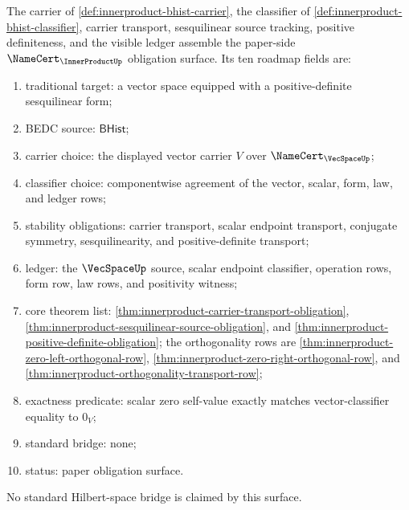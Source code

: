 \begin{theorem}
\label{thm:innerproduct-namecert-obligation-surface}
The carrier of \autoref{def:innerproduct-bhist-carrier}, the classifier of
\autoref{def:innerproduct-bhist-classifier}, carrier transport, sesquilinear
source tracking, positive definiteness, and the visible ledger assemble the
paper-side $\NameCert_{\InnerProductUp}$ obligation surface. Its ten roadmap
fields are:
\begin{enumerate}
  \item traditional target: a vector space equipped with a positive-definite
  sesquilinear form;
  \item BEDC source: $\mathsf{BHist}$;
  \item carrier choice: the displayed vector carrier $V$ over
  $\NameCert_{\VecSpaceUp}$;
  \item classifier choice: componentwise agreement of the vector, scalar,
  form, law, and ledger rows;
  \item stability obligations: carrier transport, scalar endpoint transport,
  conjugate symmetry, sesquilinearity, and positive-definite transport;
  \item ledger: the $\VecSpaceUp$ source, scalar endpoint classifier,
  operation rows, form row, law rows, and positivity witness;
  \item core theorem list:
  \autoref{thm:innerproduct-carrier-transport-obligation},
  \autoref{thm:innerproduct-sesquilinear-source-obligation}, and
  \autoref{thm:innerproduct-positive-definite-obligation};
  the orthogonality rows are
  \autoref{thm:innerproduct-zero-left-orthogonal-row},
  \autoref{thm:innerproduct-zero-right-orthogonal-row}, and
  \autoref{thm:innerproduct-orthogonality-transport-row};
  \item exactness predicate: scalar zero self-value exactly matches
  vector-classifier equality to $0_V$;
  \item standard bridge: none;
  \item status: paper obligation surface.
\end{enumerate}
No standard Hilbert-space bridge is claimed by this surface.
\end{theorem}
